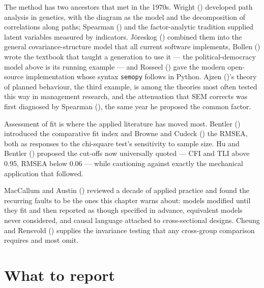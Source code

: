 \documentclass[
  letterpaper,
  10pt,
  twoside,
  openright,
  numbers=noenddot,
  chapterprefix=true]{scrbook}
\begin{document}
\begin{qmiblit}

The method has two ancestors that met in the 1970s. Wright
() developed path analysis in genetics,
with the diagram as the model and the decomposition of correlations
along paths; Spearman () and the
factor-analytic tradition supplied latent variables measured by
indicators. Jöreskog () combined them
into the general covariance-structure model that all current software
implements, Bollen () wrote the textbook
that taught a generation to use it --- the political-democracy model
above is its running example --- and Rosseel
() gave the modern open-source
implementation whose syntax \texttt{semopy} follows in Python. Ajzen
()'s theory of planned behaviour, the
third example, is among the theories most often tested this way in
management research, and the attenuation that SEM corrects was first
diagnosed by Spearman (), the
same year he proposed the common factor.

Assessment of fit is where the applied literature has moved most.
Bentler () introduced the comparative
fit index and Browne and Cudeck () the
RMSEA, both as responses to the chi-square test's sensitivity to sample
size. Hu and Bentler () proposed the cut-offs
now universally quoted --- CFI and TLI above 0.95, RMSEA below 0.06 ---
while cautioning against exactly the mechanical application that
followed.

MacCallum and Austin () reviewed a
decade of applied practice and found the recurring faults to be the ones
this chapter warns about: models modified until they fit and then
reported as though specified in advance, equivalent models never
considered, and causal language attached to cross-sectional designs.
Cheung and Rensvold () supplies the
invariance testing that any cross-group comparison requires and most
omit.

\end{qmiblit}

\section{What to report}\label{what-to-report-7}
\end{document}
